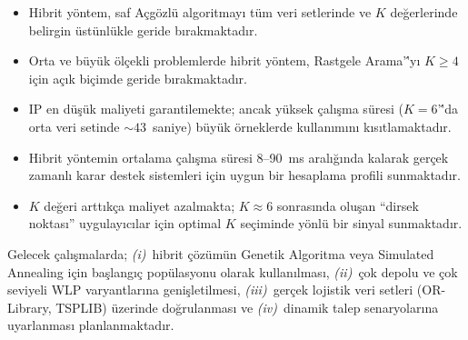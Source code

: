 \documentclass[conference]{IEEEtran}
\begin{document}
\begin{itemize}
  \item Hibrit y\"{o}ntem, saf A\c{c}g\"{o}zl\"{u} algoritmay{\i}
        t\"{u}m veri setlerinde ve $K$ de\u{g}erlerinde belirgin
        \"{u}st\"{u}nl\"{u}kle geride b{\i}rakmaktad{\i}r.
  \item Orta ve b\"{u}y\"{u}k \"{o}l\c{c}ekli problemlerde hibrit
        y\"{o}ntem, Rastgele Arama'\''y{\i} $K \geq 4$ i\c{c}in
        a\c{c}{\i}k bi\c{c}imde geride b{\i}rakmaktad{\i}r.
  \item IP en d\"{u}\c{s}\"{u}k maliyeti garantilemekte; ancak
        y\"{u}ksek \c{c}al{\i}\c{s}ma s\"{u}resi ($K{=}6$'\''da
        orta veri setinde ${\sim}43$~saniye) b\"{u}y\"{u}k \"{o}rneklerde
        kullan{\i}m{\i}n{\i} k{\i}s{\i}tlamaktad{\i}r.
  \item Hibrit y\"{o}ntemin ortalama \c{c}al{\i}\c{s}ma s\"{u}resi
        8--90~ms aral{\i}\u{g}{\i}nda kalarak ger\c{c}ek zamanl{\i}
        karar destek sistemleri i\c{c}in uygun bir hesaplama profili
        sunmaktad{\i}r.
  \item $K$ de\u{g}eri artt{\i}k\c{c}a maliyet azalmakta; $K \approx 6$
        sonras{\i}nda olu\c{s}an ``dirsek noktas{\i}'' uygulay{\i}c{\i}lar
        i\c{c}in optimal $K$ se\c{c}iminde y\"{o}nl\"{u} bir sinyal
        sunmaktad{\i}r.
\end{itemize}

Gelecek \c{c}al{\i}\c{s}malarda;
\textit{(i)}~hibrit \c{c}\"{o}z\"{u}m\"{u}n Genetik Algoritma veya
Simulated Annealing i\c{c}in ba\c{s}lang{\i}\c{c} pop\"{u}lasyonu olarak
kullan{\i}lmas{\i},
\textit{(ii)}~\c{c}ok depolu ve \c{c}ok seviyeli WLP varyantlar{\i}na
geni\c{s}letilmesi,
\textit{(iii)}~ger\c{c}ek lojistik veri setleri (OR-Library, TSPLIB)
\"{u}zerinde do\u{g}rulanmas{\i} ve
\textit{(iv)}~dinamik talep senaryolar{\i}na uyarlanmas{\i}
planlanmaktad{\i}r.
\end{document}
